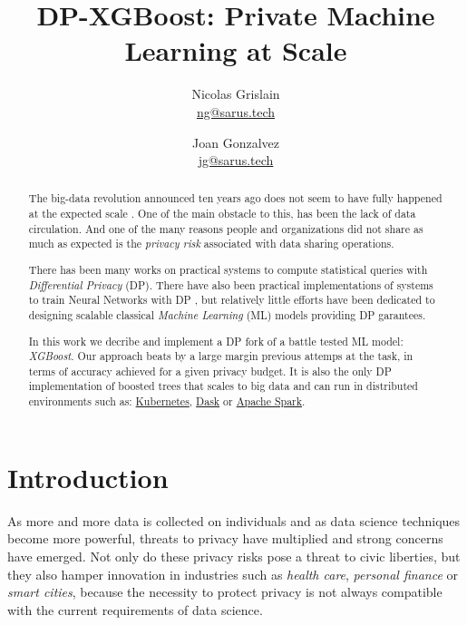 \documentclass{article}
\theoremstyle{definition}
\begin{document}
\title{DP-XGBoost: Private Machine Learning at Scale}
\author{Nicolas Grislain\\
\url{ng@sarus.tech} \\ 
\and 
Joan Gonzalvez \\
\url{jg@sarus.tech}}
\date{}
\maketitle

\begin{abstract}
The big-data revolution announced ten years ago \cite{manyika2011big}
does not seem to have fully happened at the expected scale \cite{analytics2016age}.
One of the main obstacle to this, has been the lack of data circulation.
And one of the many reasons people and organizations did not share as much as expected
is the \emph{privacy risk} associated with data sharing operations.

There has been many works on practical systems to compute statistical
queries with \emph{Differential Privacy} (DP). There have also been practical implementations of
systems to train Neural Networks with DP \cite{mcmahan2018general, opacus}, but relatively little efforts
have been dedicated to designing scalable classical \emph{Machine Learning} (ML) models providing
DP garantees.

In this work we decribe and implement a DP fork of a battle tested ML model: \emph{XGBoost}.
Our approach beats by a large margin previous attemps at the task, in terms of accuracy achieved for a given privacy budget.
It is also the only DP implementation of boosted trees that scales to big data and can run in
distributed environments such as: \href{https://kubernetes.io/}{Kubernetes}, \href{https://dask.org/}{Dask} or \href{https://spark.apache.org/}{Apache Spark}.
\end{abstract}

\section{Introduction}

As more and more data is collected on individuals and as data science techniques become more powerful,
threats to privacy have multiplied and strong concerns have emerged.
Not only do these privacy risks pose a threat to civic liberties, but they also hamper innovation in industries
such as \emph{health care}, \emph{personal finance} or \emph{smart cities}, because the necessity to protect
privacy is not always compatible with the current requirements of data science.
\end{document}
